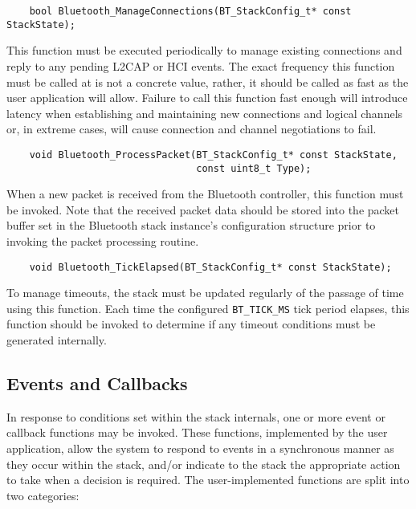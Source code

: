 \vspace{1em}
\begin{lstlisting}
	bool Bluetooth_ManageConnections(BT_StackConfig_t* const StackState);
\end{lstlisting}

This function must be executed periodically to manage existing connections and reply to any pending L2CAP or HCI events. The exact frequency this function must be called at is not a concrete value, rather, it should be called as fast as the user application will allow. Failure to call this function fast enough will introduce latency when establishing and maintaining new connections and logical channels or, in extreme cases, will cause connection and channel negotiations to fail.
	
\vspace{1em}
\begin{lstlisting}
	void Bluetooth_ProcessPacket(BT_StackConfig_t* const StackState,
	                             const uint8_t Type);
\end{lstlisting}

When a new packet is received from the Bluetooth controller, this function must be invoked. Note that the received packet data should be stored into the packet buffer set in the Bluetooth stack instance's configuration structure prior to invoking the packet processing routine.

\vspace{1em}
\begin{lstlisting}
	void Bluetooth_TickElapsed(BT_StackConfig_t* const StackState);
\end{lstlisting}

To manage timeouts, the stack must be updated regularly of the passage of time using this function. Each time the configured \lstinline{BT_TICK_MS} tick period elapses, this function should be invoked to determine if any timeout conditions must be generated internally.

\FloatBarrier
\subsection{Events and Callbacks}

In response to conditions set within the stack internals, one or more event or callback functions may be invoked. These functions, implemented by the user application, allow the system to respond to events in a synchronous manner as they occur within the stack, and/or indicate to the stack the appropriate action to take when a decision is required. The user-implemented functions are split into two categories:

